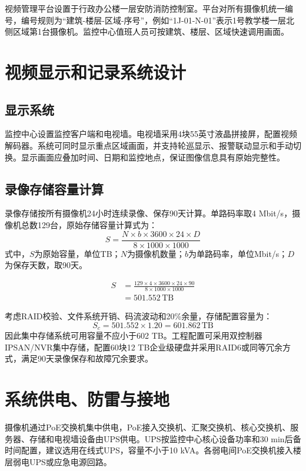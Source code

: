 \documentclass[UTF8,zihao=-4,openany]{ctexrep}
\newcommand{\unit}[1]{\,\mathrm{#1}}
\begin{document}
视频管理平台设置于行政办公楼一层安防消防控制室。平台对所有摄像机统一编号，编号规则为“建筑-楼层-区域-序号”，例如“1J-01-N-01”表示1号教学楼一层北侧区域第1台摄像机。监控中心值班人员可按建筑、楼层、区域快速调用画面。

\section{视频显示和记录系统设计}
\subsection{显示系统}
监控中心设置监控客户端和电视墙。电视墙采用4块55英寸液晶拼接屏，配置视频解码器。系统可同时显示重点区域画面，并支持轮巡显示、报警联动显示和手动切换。显示画面应叠加时间、日期和监控地点，保证图像信息具有原始完整性。

\subsection{录像存储容量计算}
录像存储按所有摄像机24小时连续录像、保存90天计算。单路码率取4 Mbit/s，摄像机总数129台，原始存储容量计算式为：
\begin{equation}
  S=\frac{N\times b\times 3600\times 24\times D}{8\times 1000\times 1000}
\end{equation}
式中，$S$为原始容量，单位TB；$N$为摄像机数量；$b$为单路码率，单位Mbit/s；$D$为保存天数，取90天。

\begin{align*}
S &= \frac{129\times4\times3600\times24\times90}{8\times1000\times1000}\\
  &= 501.552\unit{TB}
\end{align*}

考虑RAID校验、文件系统开销、码流波动和20\%余量，存储配置容量为：
\begin{equation}
  S_c=501.552\times1.20=601.862\unit{TB}
\end{equation}
因此集中存储系统可用容量不应小于602 TB。工程配置可采用双控制器IPSAN/NVR集中存储，配置60块12 TB企业级硬盘并采用RAID6或同等冗余方式，满足90天录像保存和故障冗余要求。

\section{系统供电、防雷与接地}
摄像机通过PoE交换机集中供电，PoE接入交换机、汇聚交换机、核心交换机、服务器、存储和电视墙设备由UPS供电。UPS按监控中心核心设备功率和30 min后备时间配置，建议选用在线式UPS，容量不小于10 kVA。各弱电间PoE交换机接入楼层弱电UPS或应急电源回路。
\end{document}
